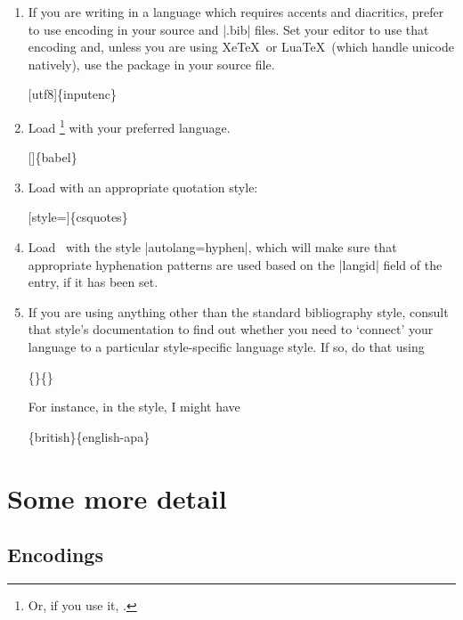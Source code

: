 \begin{enumerate}
 \item If you are writing in a language which requires accents and diacritics, prefer to use  encoding in your source and |.bib| files. Set your editor to use that encoding and, unless you are using Xe\TeX\ or Lua\TeX\ (which handle unicode natively), use the  package in your source file.
 \begin{pseudoverb}
 [utf8]\{inputenc\}
 \end{pseudoverb}
 \item Load \footnote{Or, if you use it, .} with your preferred language.
 \begin{pseudoverb}
 []\{babel\}
 \end{pseudoverb}
 \item Load  with an appropriate quotation style:
 \begin{pseudoverb}
 [style=]\{csquotes\}
 \end{pseudoverb}
 \item Load \biblatex\ with the style |autolang=hyphen|, which will make sure that appropriate hyphenation patterns are used based on the |langid| field of the entry, if it has been set.
 \item If you are using anything other than the standard bibliography style, consult that style's documentation to find out whether you need to `connect' your language to a particular style-specific language style. If so, do that using
 \begin{pseudoverb}
 \{\}\{\}
 \end{pseudoverb}
 For instance, in the  style, I might have
 \begin{pseudoverb}
 \{british\}\{english-apa\}
 \end{pseudoverb}
\end{enumerate}

\section{Some more detail}

\subsection{Encodings}

